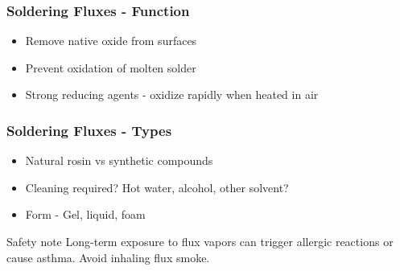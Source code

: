\documentclass{beamer}
\begin{document}
\begin{frame}
\frametitle{Soldering Fluxes - Function}
\begin{itemize}
\item Remove native oxide from surfaces
\item Prevent oxidation of molten solder
\item Strong reducing agents - oxidize rapidly when heated in air
\end{itemize}
\end{frame}

\begin{frame}
\frametitle{Soldering Fluxes - Types}
\begin{itemize}
\item Natural rosin vs synthetic compounds
\item Cleaning required? Hot water, alcohol, other solvent?
\item Form - Gel, liquid, foam
\end{itemize}
\begin{alertblock}{Safety note}
Long-term exposure to flux vapors can trigger allergic reactions or cause asthma. Avoid inhaling flux smoke.
\end{alertblock}
\end{frame}
\end{document}
